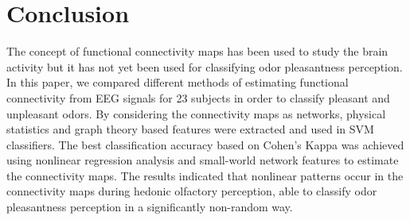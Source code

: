 \section{Conclusion}
The concept of functional connectivity maps has been used to study the brain activity but it has not yet been used for classifying odor pleasantness perception. In this paper, we compared different methods of estimating functional connectivity from EEG signals for 23 subjects in order to classify pleasant and unpleasant odors. By considering the connectivity maps as networks, physical statistics and graph theory based features were extracted and used in SVM classifiers. The best classification accuracy based on Cohen's Kappa was achieved using nonlinear regression analysis and small-world network features to estimate the connectivity maps. The results indicated that nonlinear patterns occur in the connectivity maps during hedonic olfactory perception, able to classify odor pleasantness perception in a significantly non-random way.  
